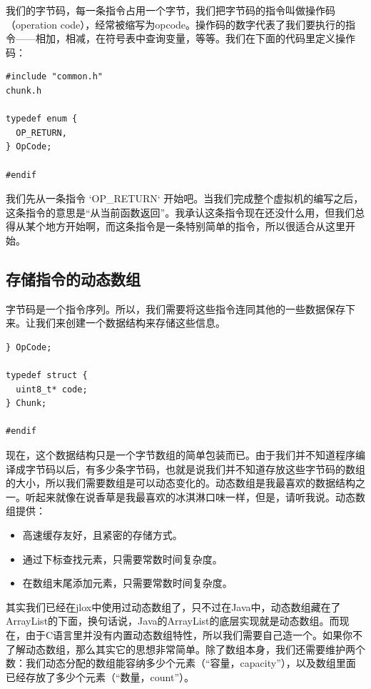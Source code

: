 \documentclass[cn,10pt,math=newtx,citestyle=gb7714-2015,bibstyle=gb7714-2015]{elegantbook}
\newenvironment{code}{\captionsetup{type=listing}}{}
\begin{document}
我们的字节码，每一条指令占用一个字节，我们把字节码的指令叫做操作码（operation code），经常被缩写为opcode。操作码的数字代表了我们要执行的指令——相加，相减，在符号表中查询变量，等等。我们在下面的代码里定义操作码：

\begin{code}
\begin{verbatim}
#include "common.h"
chunk.h

typedef enum {
  OP_RETURN,
} OpCode;

#endif
\end{verbatim}
\end{code}

我们先从一条指令 `OP\_RETURN` 开始吧。当我们完成整个虚拟机的编写之后，这条指令的意思是“从当前函数返回”。我承认这条指令现在还没什么用，但我们总得从某个地方开始啊，而这条指令是一条特别简单的指令，所以很适合从这里开始。

\subsection{存储指令的动态数组}

字节码是一个指令序列。所以，我们需要将这些指令连同其他的一些数据保存下来。让我们来创建一个数据结构来存储这些信息。

\begin{code}
\begin{verbatim}
} OpCode;

typedef struct {
  uint8_t* code;
} Chunk;

#endif
\end{verbatim}
\end{code}

现在，这个数据结构只是一个字节数组的简单包装而已。由于我们并不知道程序编译成字节码以后，有多少条字节码，也就是说我们并不知道存放这些字节码的数组的大小，所以我们需要数组是可以动态变化的。动态数组是我最喜欢的数据结构之一。听起来就像在说香草是我最喜欢的冰淇淋口味一样，但是，请听我说。动态数组提供：

\begin{itemize}
   \item 高速缓存友好，且紧密的存储方式。
   \item 通过下标查找元素，只需要常数时间复杂度。
   \item 在数组末尾添加元素，只需要常数时间复杂度。
\end{itemize}

其实我们已经在jlox中使用过动态数组了，只不过在Java中，动态数组藏在了ArrayList的下面，换句话说，Java的ArrayList的底层实现就是动态数组。而现在，由于C语言里并没有内置动态数组特性，所以我们需要自己造一个。如果你不了解动态数组，那么其实它的思想非常简单。除了数组本身，我们还需要维护两个数：我们动态分配的数组能容纳多少个元素（“容量，capacity”），以及数组里面已经存放了多少个元素（“数量，count”）。
\end{document}
